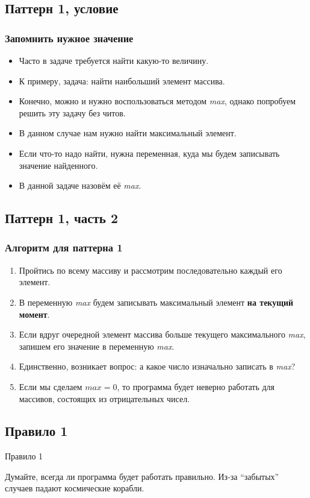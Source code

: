 \documentclass[compress,red]{beamer}
\begin{document}
\subsection{Паттерн 1, условие}
\begin{frame}[fragile]
\frametitle{Запомнить нужное значение}
		\begin{itemize}
			\item Часто в задаче требуется найти какую-то величину.
			\item К примеру, задача: найти наибольший элемент массива.
			\item Конечно, можно и нужно воспользоваться методом \emph{max}, однако попробуем решить эту задачу без читов.
			\item В данном случае нам нужно найти максимальный элемент.
			\item Если что-то надо найти, нужна переменная, куда мы будем записывать значение найденного.
			\item В данной задаче назовём её \emph{max}.
		\end{itemize}
\end{frame}

\subsection{Паттерн 1, часть 2}
\begin{frame}[fragile]
\frametitle{Алгоритм для паттерна 1}
	\begin{enumerate}
		\item Пройтись по всему массиву и рассмотрим последовательно каждый его элемент.
		\item В переменную \emph{max} будем записывать максимальный элемент \textbf{на текущий момент}.
		\item Если вдруг очередной элемент массива больше текущего максимального \emph{max}, запишем его значение в переменную \emph{max}.
		\item Единственно, возникает вопрос: а какое число изначально записать в \emph{max}?
		\item Если мы сделаем $max = 0$, то программа будет неверно работать для массивов, состоящих из отрицательных чисел.
	\end{enumerate}
\end{frame}

\subsection{Правило 1}
\begin{frame}
	\begin{center}
		\Huge{Правило 1}
	\end{center}
	\begin{center}
		\Large{Думайте, всегда ли программа будет работать правильно. Из-за ``забытых'' случаев падают космические корабли. }
	\end{center}
\end{frame}
\end{document}
